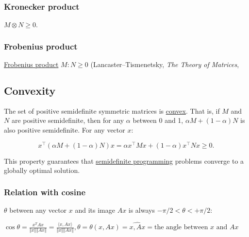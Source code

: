 {{{{{{{{{{{{{{{{{%
%
\hypertarget{kronecker-product}{%
\subsubsection{Kronecker product}\label{kronecker-product}}
%
\(M \otimes N \geq 0\).
%
\hypertarget{frobenius-product}{%
\subsubsection{Frobenius product}\label{frobenius-product}}
%
\href{Matrix_multiplication\#Frobenius_product}{Frobenius product}
\(M : N \geq 0\) (Lancaster--Tismenetsky, \emph{The Theory of Matrices},

\hypertarget{convexity}{%
\subsection{Convexity}\label{convexity}}

The set of positive semidefinite symmetric matrices is
\href{convex_set}{convex}. That is, if \(M\) and \(N\) are positive
semidefinite, then for any \(\alpha\) between 0 and 1,
\(\alpha M + (1 - \alpha) N\) is also positive semidefinite. For any
vector \(x\):

\[x^\top  \left(\alpha M + (1 - \alpha)N\right)x = \alpha x^\top  Mx + (1 - \alpha) x^\top  Nx \geq 0.\]

This property guarantees that
\href{semidefinite_programming}{semidefinite programming} problems
converge to a globally optimal solution.

\hypertarget{relation-with-cosine}{%
\subsubsection{Relation with cosine}\label{relation-with-cosine}}
%
\(\theta\) between any vector \(x\) and its image \(Ax\) is always
\(-\pi / 2 < \theta < +\pi / 2\):
%
\begin{description}
\item
\(\cos\theta = \frac{x^{T}Ax}{\left\Vert x \right\Vert \left\Vert Ax \right\Vert}=\frac{\langle x,Ax \rangle}{\left\Vert x \right\Vert \left\Vert Ax \right\Vert} ,  \theta=\theta(x,Ax)=\widehat{x,Ax}= \text{the angle between } x \text{ and } Ax\)
\end{description}

}}}}}}}}}}}}}}}}}
